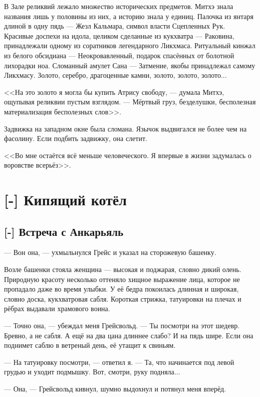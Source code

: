 \asterism

В Зале реликвий лежало множество исторических предметов.
Митхэ знала названия лишь у половины из них, а историю знала у единиц.
Палочка из янтаря длиной в одну пядь --- Жезл Кальмара, символ власти Сцепленных Рук.
Красивые доспехи на идола, целиком сделанные из кукхватра --- Раковина, принадлежали одному из соратников легендарного Ликхмаса.
Ритуальный кинжал из белого обсидиана --- Неокровавленный, подарок спасённых от болотной лихорадки ноа.
Сломанный амулет Сана --- Затмение, якобы принадлежал самому Ликхмасу.
Золото, серебро, драгоценные камни, золото, золото, золото...

<<На это золото я могла бы купить Атрису свободу, --- думала Митхэ, ощупывая реликвии пустым взглядом.
--- Мёртвый груз, безделушки, бесполезная материализация бесполезных слов>>.

Задвижка на западном окне была сломана.
Язычок выдвигался не более чем на фасолину.
Если подбить задвижку, она слетит.

<<Во мне остаётся всё меньше человеческого.
Я впервые в жизни задумалась о воровстве всерьёз>>.

\chapter{[-] Кипящий котёл}

\section{[-] Встреча с Анкарьяль}

--- Вон она, --- ухмыльнулся Грейс и указал на сторожевую башенку.

Возле башенки стояла женщина --- высокая и поджарая, словно дикий олень.
Природную красоту несколько оттеняло хищное выражение лица, которое не пропадало даже во время улыбки.
У её бедра покоилась длинная и широкая, словно доска, кукхватровая сабля.
Короткая стрижка, татуировки на плечах и рёбрах выдавали храмового воина.

--- Точно она, --- убеждал меня Грейсвольд.
--- Ты посмотри на этот шедевр.
Бревно, а не сабля.
А ещё на два цана длиннее слабо?
И на пядь шире.
Если она поднимет саблю в ветреный день, её утащит к свиньям.

--- На татуировку посмотри, --- ответил я.
--- Та, что начинается под левой грудью и уходит подмышку.
Вот, смотри, руку подняла...

--- Она, --- Грейсвольд кивнул, шумно выдохнул и потянул меня вперёд.

